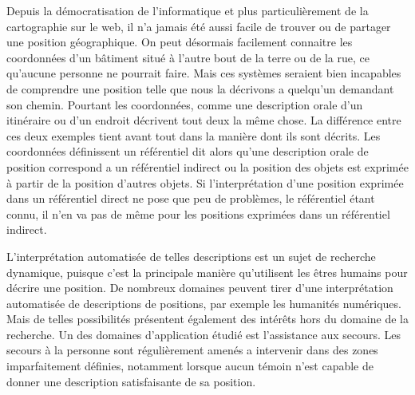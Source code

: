 
Depuis la démocratisation de l'informatique et plus particulièrement
de la cartographie sur le web, il n'a jamais été aussi facile de
trouver ou de partager une position géographique. On peut désormais
facilement connaitre les coordonnées d'un bâtiment situé à l'autre
bout de la terre ou de la rue, ce qu'aucune personne ne pourrait
faire. Mais ces systèmes seraient bien incapables de comprendre une
position telle que nous la décrivons a quelqu’un demandant son
chemin. Pourtant les coordonnées, comme une description orale d'un
itinéraire ou d'un endroit décrivent tout deux la même chose. La
différence entre ces deux exemples tient avant tout dans la manière
dont ils sont décrits. Les coordonnées définissent un référentiel dit
 alors qu'une description orale de position correspond
a un référentiel indirect ou la position des objets est exprimée à
partir de la position d'autres objets. Si l’interprétation d'une
position exprimée dans un référentiel direct ne pose que peu de
problèmes, le référentiel étant connu, il n'en va pas de même pour les
positions exprimées dans un référentiel indirect.

L'interprétation automatisée de telles descriptions est un sujet de
recherche dynamique, puisque c'est la principale manière qu'utilisent
les êtres humains pour décrire une position. De nombreux domaines
peuvent tirer d'une interprétation automatisée de descriptions de
positions, par exemple les humanités numériques. Mais de telles
possibilités présentent également des intérêts hors du domaine de la
recherche. Un des domaines d’application étudié est l'assistance aux
secours. Les secours à la personne sont régulièrement amenés a
intervenir dans des zones imparfaitement définies, notamment lorsque
aucun témoin  n'est capable de donner une description satisfaisante de
sa position.









